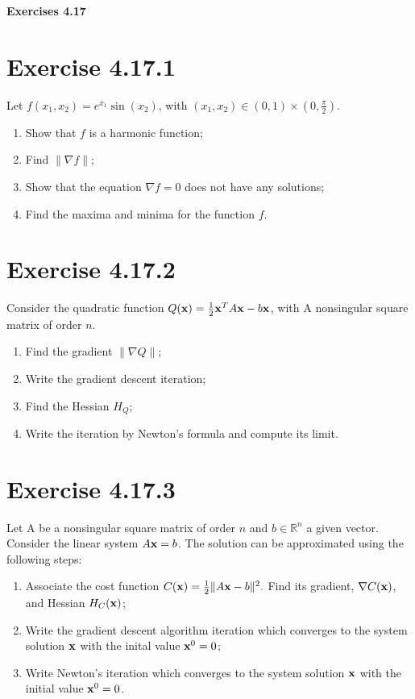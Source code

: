 \documentclass{exam}
\begin{document}
\begin{center}
    \textbf{\Large Exercises 4.17 }
\end{center}

\section*{Exercise 4.17.1}
Let $f(x_1,x_2) = e^{x_1}\sin(x_2)$, with $(x_1,x_2) \in (0,1) \times (0,\frac{\pi}{2})$.
\begin{enumerate}
    \item Show that $f$ is a harmonic function;
    \item Find $\lVert \nabla f \lVert$;
    \item Show that the equation $\nabla f = 0$ does not have any solutions;
    \item Find the maxima and minima for the function $f$.
\end{enumerate}

\section*{Exercise 4.17.2}
Consider the quadratic function $Q(\bold{x}) = \frac{1}{2} \bold{x}^{T} A \bold{x} - b \bold{x}$, with A nonsingular square matrix of order $n$.
\begin{enumerate}
    \item Find the gradient $\lVert \nabla Q \lVert$;
    \item Write the gradient descent iteration;
    \item Find the Hessian $H_{Q}$;
    \item Write the iteration by Newton's formula and compute its limit.
\end{enumerate}

\section*{Exercise 4.17.3}
Let A be a nonsingular square matrix of order $n$ and $b \in \mathbb{R}^{n}$ a given vector. Consider the linear system $A\bold{x} = b$. The solution can be approximated using 
the following steps:\\
\begin{enumerate}
    \item Associate the cost function $C(\bold{x}) = \frac{1}{2} \lVert A \bold{x} - b \lVert^{2}.$ Find its gradient, $\nabla C(\bold{x})$,
    and Hessian $H_{C}(\bold{x})$;
    \item Write the gradient descent algorithm iteration which converges to the system solution $\bold{x}$ with the inital value $\bold{x}^{0} = 0$;
    \item Write Newton's iteration which converges to the system solution $\bold{x}$ with the initial value $\bold{x}^{0} = 0$.
\end{enumerate}
\end{document}
